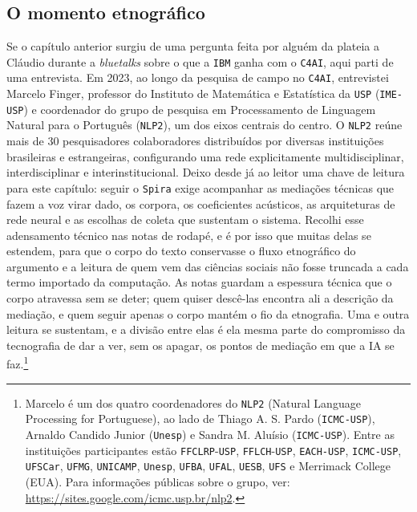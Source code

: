 \subsection{O momento etnográfico}
\label{subsec:momento_etnografico}

Se o capítulo anterior surgiu de uma pergunta feita por alguém da plateia a Cláudio durante a \textit{bluetalks} sobre o que a \texttt{IBM} ganha com o \texttt{C4AI}, aqui parti de uma entrevista. Em 2023, ao longo da pesquisa de campo no \texttt{C4AI}, entrevistei Marcelo Finger, professor do Instituto de Matemática e Estatística da \texttt{USP} (\texttt{IME-USP}) e coordenador do grupo de pesquisa em Processamento de Linguagem Natural para o Português (\texttt{NLP2}), um dos eixos centrais do centro. O \texttt{NLP2} reúne mais de 30 pesquisadores colaboradores distribuídos por diversas instituições brasileiras e estrangeiras, configurando uma rede explicitamente multidisciplinar, interdisciplinar e interinstitucional. Deixo desde já ao leitor uma chave de leitura para este capítulo: seguir o \texttt{Spira} exige acompanhar as mediações técnicas que fazem a voz virar dado, os corpora, os coeficientes acústicos, as arquiteturas de rede neural e as escolhas de coleta que sustentam o sistema. Recolhi esse adensamento técnico nas notas de rodapé, e é por isso que muitas delas se estendem, para que o corpo do texto conservasse o fluxo etnográfico do argumento e a leitura de quem vem das ciências sociais não fosse truncada a cada termo importado da computação. As notas guardam a espessura técnica que o corpo atravessa sem se deter; quem quiser descê-las encontra ali a descrição da mediação, e quem seguir apenas o corpo mantém o fio da etnografia. Uma e outra leitura se sustentam, e a divisão entre elas é ela mesma parte do compromisso da tecnografia de dar a ver, sem os apagar, os pontos de mediação em que a IA se faz.\footnote{Marcelo é um dos quatro coordenadores do \texttt{NLP2} (Natural Language Processing for Portuguese), ao lado de Thiago A. S. Pardo (\texttt{ICMC-USP}), Arnaldo Candido Junior (\texttt{Unesp}) e Sandra M. Aluísio (\texttt{ICMC-USP}). Entre as instituições participantes estão \texttt{FFCLRP}-\texttt{USP}, \texttt{FFLCH}-\texttt{USP}, \texttt{EACH-USP}, \texttt{ICMC-USP}, \texttt{UFSCar}, \texttt{UFMG}, \texttt{UNICAMP}, \texttt{Unesp}, \texttt{UFBA}, \texttt{UFAL}, \texttt{UESB}, \texttt{UFS} e Merrimack College (EUA). Para informações públicas sobre o grupo, ver: \url{https://sites.google.com/icmc.usp.br/nlp2}.}

